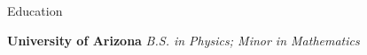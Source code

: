 \documentclass{resume} %
\begin{document}

\begin{rSection}{Education}
	
	{\bf University of Arizona} {\em B.S. in Physics; Minor in Mathematics} \\ 
	\nolinebreak	
	
\end{rSection}


%	
%




\end{document}
